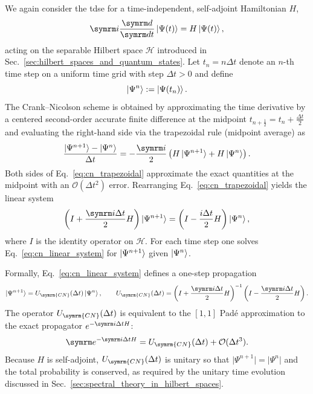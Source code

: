 We again consider the \gls{tdse} for a time-independent, self-adjoint Hamiltonian $H$,
\begin{equation}\label{eq:tdse_cn}
\i\ddt\ket{\Psi(t)}=H\ket{\Psi(t)},
\end{equation}
acting on the separable Hilbert space $\mathcal{H}$ introduced in Sec.~\ref{sec:hilbert_spaces_and_quantum_states}. Let $t_n=n\Delta t$ denote an $n$-th time step on a uniform time grid with step $\Delta t>0$ and define
\begin{equation}
\ket{\Psi^n}:=\ket{\Psi(t_n)}.
\end{equation}
The Crank–Nicolson scheme is obtained by approximating the time derivative by a centered second-order accurate finite difference at the midpoint $t_{n+\frac{1}{2}}=t_n+\frac{\Delta t}{2}$ and evaluating the right-hand side via the trapezoidal rule (midpoint average) as
\begin{equation}\label{eq:cn_trapezoidal}
\frac{\ket{\Psi^{n+1}}-\ket{\Psi^n}}{\Delta t}=-\frac{\i}{2}\left(H\ket{\Psi^{n+1}}+H\ket{\Psi^n}\right).
\end{equation}
Both sides of Eq.~\eqref{eq:cn_trapezoidal} approximate the exact quantities at the midpoint
with an $\mathcal{O}(\Delta t^2)$ error. Rearranging Eq.~\eqref{eq:cn_trapezoidal} yields the linear system
\begin{equation}\label{eq:cn_linear_system}
\left(I+\frac{\i\Delta t}{2}H\right)\ket{\Psi^{n+1}}=\left(I-\frac{i\Delta t}{2}H\right)\ket{\Psi^n},
\end{equation}
where $I$ is the identity operator on $\mathcal{H}$. For each time step one solves Eq.~\eqref{eq:cn_linear_system} for $\ket{\Psi^{n+1}}$ given $\ket{\Psi^n}$.

Formally, Eq.~\eqref{eq:cn_linear_system} defines a one-step propagation
\begin{equation}\label{eq:cn_propagator_operator}
\ket{\Psi^{n+1}}=U_{\symrm{CN}}(\Delta t)\ket{\Psi^n},\qquad U_{\symrm{CN}}(\Delta t)=\left(I+\frac{\i\Delta t}{2}H\right)^{-1}\left(I-\frac{\i\Delta t}{2}H\right).
\end{equation}
The operator $U_{\symrm{CN}}(\Delta t)$ is equivalent to the $[1,1]$ Padé approximation to the exact propagator $e^{-\i\Delta t H}$:
\begin{equation}
\e^{-\i\Delta t H}=U_{\symrm{CN}}(\Delta t)+\mathcal{O}(\Delta t^3).
\end{equation}
Because $H$ is self-adjoint, $U_{\symrm{CN}}(\Delta t)$ is unitary so that $\lvert\Psi^{n+1}\rvert=\lvert\Psi^n\rvert$ and the total probability is conserved, as required by the unitary time evolution discussed in Sec.~\ref{sec:spectral_theory_in_hilbert_spaces}.
